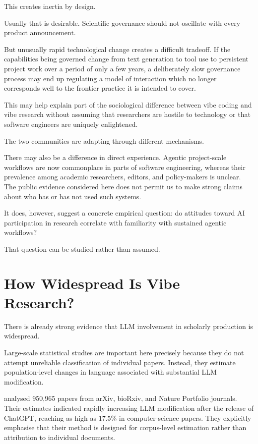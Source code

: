 This creates inertia by design.

Usually that is desirable. Scientific governance should not oscillate with every product announcement.

But unusually rapid technological change creates a difficult tradeoff. If the capabilities being governed change from text generation to tool use to persistent project work over a period of only a few years, a deliberately slow governance process may end up regulating a model of interaction which no longer corresponds well to the frontier practice it is intended to cover.

This may help explain part of the sociological difference between vibe coding and vibe research without assuming that researchers are hostile to technology or that software engineers are uniquely enlightened.

The two communities are adapting through different mechanisms.

There may also be a difference in direct experience. Agentic project-scale workflows are now commonplace in parts of software engineering, whereas their prevalence among academic researchers, editors, and policy-makers is unclear. The public evidence considered here does not permit us to make strong claims about who has or has not used such systems.

It does, however, suggest a concrete empirical question: do attitudes toward AI participation in research correlate with familiarity with sustained agentic workflows?

That question can be studied rather than assumed.


\section{How Widespread Is Vibe Research?}

There is already strong evidence that LLM involvement in scholarly production is widespread.

Large-scale statistical studies are important here precisely because they do not attempt unreliable classification of individual papers. Instead, they estimate population-level changes in language associated with substantial LLM modification.

\citet{liangEtAl2024mapping} analysed 950,965 papers from arXiv, bioRxiv, and Nature Portfolio journals. Their estimates indicated rapidly increasing LLM modification after the release of ChatGPT, reaching as high as 17.5\% in computer-science papers. They explicitly emphasise that their method is designed for corpus-level estimation rather than attribution to individual documents.

